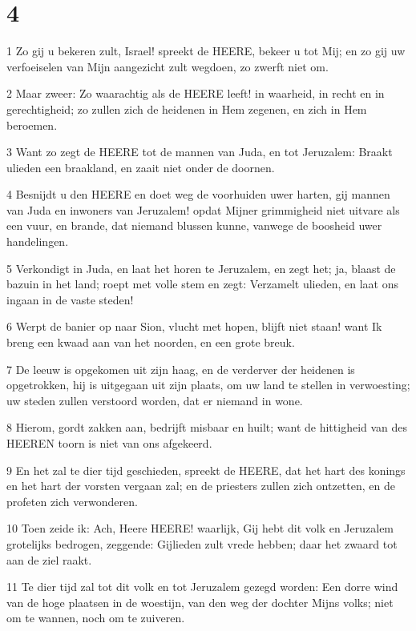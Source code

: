 \chapter{4}

\par 1 Zo gij u bekeren zult, Israel! spreekt de HEERE, bekeer u tot Mij; en zo gij uw verfoeiselen van Mijn aangezicht zult wegdoen, zo zwerft niet om.
\par 2 Maar zweer: Zo waarachtig als de HEERE leeft! in waarheid, in recht en in gerechtigheid; zo zullen zich de heidenen in Hem zegenen, en zich in Hem beroemen.
\par 3 Want zo zegt de HEERE tot de mannen van Juda, en tot Jeruzalem: Braakt ulieden een braakland, en zaait niet onder de doornen.
\par 4 Besnijdt u den HEERE en doet weg de voorhuiden uwer harten, gij mannen van Juda en inwoners van Jeruzalem! opdat Mijner grimmigheid niet uitvare als een vuur, en brande, dat niemand blussen kunne, vanwege de boosheid uwer handelingen.
\par 5 Verkondigt in Juda, en laat het horen te Jeruzalem, en zegt het; ja, blaast de bazuin in het land; roept met volle stem en zegt: Verzamelt ulieden, en laat ons ingaan in de vaste steden!
\par 6 Werpt de banier op naar Sion, vlucht met hopen, blijft niet staan! want Ik breng een kwaad aan van het noorden, en een grote breuk.
\par 7 De leeuw is opgekomen uit zijn haag, en de verderver der heidenen is opgetrokken, hij is uitgegaan uit zijn plaats, om uw land te stellen in verwoesting; uw steden zullen verstoord worden, dat er niemand in wone.
\par 8 Hierom, gordt zakken aan, bedrijft misbaar en huilt; want de hittigheid van des HEEREN toorn is niet van ons afgekeerd.
\par 9 En het zal te dier tijd geschieden, spreekt de HEERE, dat het hart des konings en het hart der vorsten vergaan zal; en de priesters zullen zich ontzetten, en de profeten zich verwonderen.
\par 10 Toen zeide ik: Ach, Heere HEERE! waarlijk, Gij hebt dit volk en Jeruzalem grotelijks bedrogen, zeggende: Gijlieden zult vrede hebben; daar het zwaard tot aan de ziel raakt.
\par 11 Te dier tijd zal tot dit volk en tot Jeruzalem gezegd worden: Een dorre wind van de hoge plaatsen in de woestijn, van den weg der dochter Mijns volks; niet om te wannen, noch om te zuiveren.
